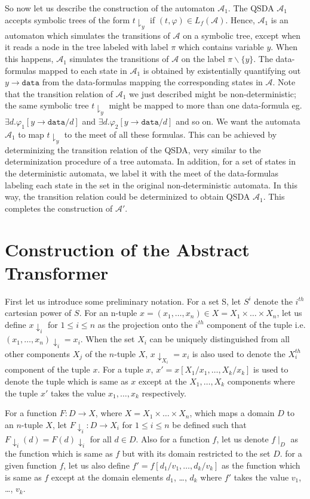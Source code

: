 \documentclass{llncs}
\newcommand{\A}{\mathcal{A}}
\newcommand{\data}{\texttt{data}}
\begin{document}
So now let us describe the construction of the automaton $\A_1$. The QSDA $\A_1$ accepts symbolic trees of the form $t \downharpoonright_y$ if $(t, \varphi) \in L_f(\A)$. Hence, $\A_1$ is an automaton which simulates the transitions of $\A$ on a symbolic tree, except when it reads a node in the tree labeled with label $\pi$ which contains variable $y$. When this happens, $\A_1$ simulates the transitions of $\A$ on the label $\pi \backslash \{y\}$.
The data-formulas mapped to each state in $\A_1$ is obtained by existentially quantifying out $y\rightarrow\data$ from the data-formulas mapping the corresponding states in $\A$. 
Note that the transition relation of $\A_1$ we just described might be non-deterministic; the same symbolic tree $t \downharpoonright_y$ might be mapped to more than one data-formula eg. $\exists d. \varphi_1[y\rightarrow\data/d]$ and $\exists d. \varphi_2[y\rightarrow\data/d]$ and so on. We want the automata $\A_1$ to map $t \downharpoonright_y$ to the meet of all these formulas. This can be achieved by determinizing the transition relation of the QSDA, very similar to the determinization procedure of a tree automata. In addition, for a set of states in the deterministic automata, we label it with the meet of the data-formulas labeling each state in the set in the original non-deterministic automata.
In this way, the transition relation could be determinized to obtain QSDA $\A_1$. This completes the construction of $\A'$.


\section{Construction of the Abstract Transformer}\label{app-construction}

First let us introduce some preliminary notation.
For a set S, let $S^i$ denote the $i^{th}$ cartesian power of $S$.
For an n-tuple $x = (x_1, \ldots, x_n) \in X = X_1 \times \ldots \times X_n$, let us define $x \downarrow_i$ for $1 \leq i \leq n$ as the projection onto the $i^{th}$ component of the tuple i.e. $(x_1, \ldots, x_n)\downarrow_i = x_i$. 
When the set $X_i$ can be uniquely distinguished from all other components $X_j$ of the $n$-tuple $X$, $x \downarrow_{X_i} = x_i$ is also used to denote the $X_i^{th}$ component of the tuple $x$. For a tuple $x$, $x' = x[X_1/x_1, \ldots, X_k/x_k]$ is used to denote the tuple which is same as $x$ except at the $X_1, \ldots, X_k$ components where the tuple $x'$ takes the value $x_1, \ldots, x_k$ respectively.


For a function $F: D \rightarrow X$, where $X = X_1 \times \ldots \times X_n$, which maps a domain $D$ to an $n$-tuple $X$, let $F\downarrow_i: D \rightarrow X_i$ for $1 \leq i \leq n$ be defined such that $F\downarrow_i(d) = F(d)\downarrow_i$ for all $d \in D$.
Also for a function $f$, let us denote $f \mid_D$ as the function which is same as $f$ but with its domain restricted to the set $D$. for a given function $f$, let us also define $f' = f[d_1/v_1, \ldots, d_k/v_k]$ as the function which is same as $f$ except at the domain elements $d_1$, \ldots, $d_k$ where $f'$ takes the value $v_1$, \ldots, $v_k$.
\end{document}
